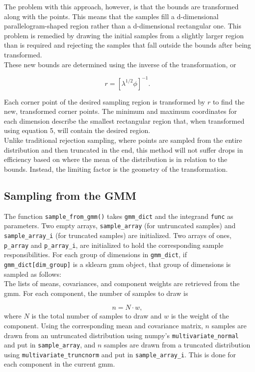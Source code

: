 \documentclass{article}
\begin{document}
The problem with this approach, however, is that the bounds are transformed
along with the points. This means that the samples fill a d-dimensional
parallelogram-shaped region rather than a d-dimensional rectangular one. This
problem is remedied by drawing the initial samples from a slightly larger region
than is required and rejecting the samples that fall outside the bounds after
being transformed. \\

These new bounds are determined using the inverse of the transformation, or

\begin{equation}
    r = [\lambda^{1/2} \phi]^{-1}.
\end{equation}

Each corner point of the desired sampling region is transformed by $r$ to find
the new, transformed corner points.  The minimum and maximum coordinates for
each dimension describe the smallest rectangular region that, when transformed
using equation 5, will contain the desired region. \\

Unlike traditional rejection sampling, where points are sampled from the entire
distribution and then truncated in the end, this method will not suffer drops in
efficiency based on where the mean of the distribution is in relation to the
bounds. Instead, the limiting factor is the geometry of the transformation.

\subsection{Sampling from the GMM}

The function \texttt{sample\_from\_gmm()} takes \texttt{gmm\_dict} and the
integrand \texttt{func} as parameters. Two empty arrays,
\texttt{sample\_array} (for untruncated samples) and \texttt{sample\_array\_i}
(for truncated samples) are initialized. Two arrays of ones, \texttt{p\_array}
and \texttt{p\_array\_i}, are initialized to hold the corresponding sample
responsibilities. For each group of dimensions in \texttt{gmm\_dict}, if
\texttt{gmm\_dict[dim\_group]} is a sklearn gmm object, that group of dimensions
 is sampled as follows: \\

The lists of means, covariances, and component weights are retrieved from the
gmm. For each component, the number of samples to draw is

\begin{equation}
    n = N \cdot w,
\end{equation}
where $N$ is the total number of samples to draw and $w$ is the weight of the
component. Using the corresponding mean and covariance matrix, $n$ samples are
drawn from an untruncated distribution using numpy's
\texttt{multivariate\_normal} and put in \texttt{sample\_array}, and
$n$ samples are drawn from a truncated distribution using
\texttt{multivariate\_truncnorm} and put in \texttt{sample\_array\_i}. This is
done for each component in the current gmm. \\
\end{document}
